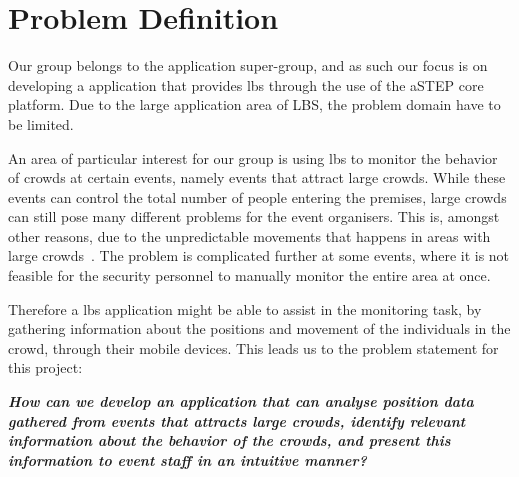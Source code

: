 \section{Problem Definition} \label{sec:problem_def}
Our group belongs to the application super-group, and as such our focus is on developing a application that provides \gls{lbs} through the use of the aSTEP core platform. Due to the large application area of LBS, the problem domain have to be limited. 

An area of particular interest for our group is using \gls{lbs} to monitor the behavior of crowds at certain events, namely events that attract large crowds. While these events can control the total number of people entering the premises, large crowds can still pose many different problems for the event organisers. This is, amongst other reasons, due to the unpredictable movements that happens in areas with large crowds~\cite{wirz2012inferring}. The problem is complicated further at some events, where it is not feasible for the security personnel to manually monitor the entire area at once. 

Therefore a \gls{lbs} application might be able to assist in the monitoring task, by gathering information about the positions and movement of the individuals in the crowd, through their mobile devices. This leads us to the problem statement for this project:

\vspace{0.5 cm}
\begin{center}
	\textbf{\textit{How can we develop an application that can analyse position data gathered from events that attracts large crowds, identify relevant information about the behavior of the crowds, and present this information to event staff in an intuitive manner?}}
\end{center}